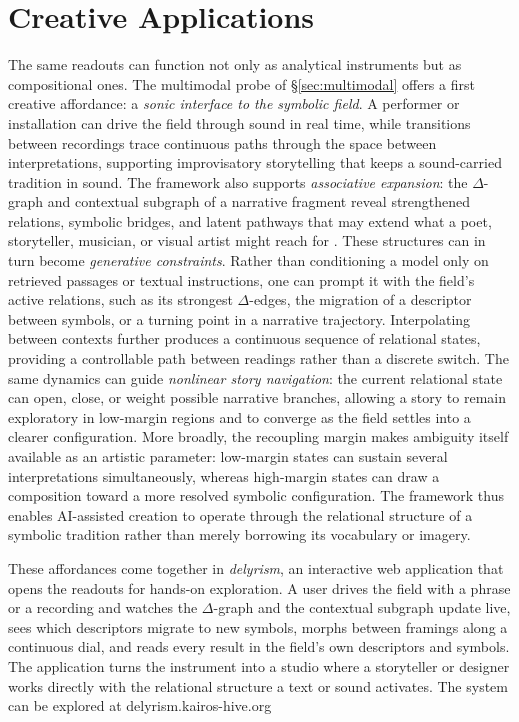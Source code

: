 \documentclass[final,creativeai]{article}
\begin{document}
\section{Creative Applications}
The same readouts can function not only as analytical instruments but as compositional ones. The multimodal probe of \S\ref{sec:multimodal} offers a first creative affordance: a \emph{sonic interface to the symbolic field}. A performer or installation can drive the field through sound in real time, while transitions between recordings trace continuous paths through the space between interpretations, supporting improvisatory storytelling that keeps a sound-carried tradition in sound. The framework also supports \emph{associative expansion}: the $\Delta$-graph and contextual subgraph of a narrative fragment reveal strengthened relations, symbolic bridges, and latent pathways that may extend what a poet, storyteller, musician, or visual artist might reach for \citep{varshney_associative_2016, gross_lexical_2012, rick_supermind_2023}. These structures can in turn become \emph{generative constraints}. Rather than conditioning a model only on retrieved passages or textual instructions, one can prompt it with the field's active relations, such as its strongest $\Delta$-edges, the migration of a descriptor between symbols, or a turning point in a narrative trajectory. Interpolating between contexts further produces a continuous sequence of relational states, providing a controllable path between readings rather than a discrete switch. The same dynamics can guide \emph{nonlinear story navigation}: the current relational state can open, close, or weight possible narrative branches, allowing a story to remain exploratory in low-margin regions and to converge as the field settles into a clearer configuration. More broadly, the recoupling margin makes ambiguity itself available as an artistic parameter: low-margin states can sustain several interpretations simultaneously, whereas high-margin states can draw a composition toward a more resolved symbolic configuration. The framework thus enables AI-assisted creation to operate through the relational structure of a symbolic tradition rather than merely borrowing its vocabulary or imagery.

These affordances come together in \emph{delyrism}, an interactive web application that opens the readouts for hands-on exploration. A user drives the field with a phrase or a recording and watches the $\Delta$-graph and the contextual subgraph update live, sees which descriptors migrate to new symbols, morphs between framings along a continuous dial, and reads every result in the field's own descriptors and symbols. The application turns the instrument into a studio where a storyteller or designer works directly with the relational structure a text or sound activates. The system can be explored at delyrism.kairos-hive.org
\end{document}
